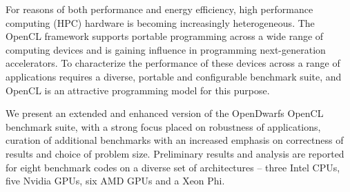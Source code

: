 \documentclass[../document.tex]{subfiles}
\begin{document}
For reasons of both performance and energy efficiency, high performance computing (HPC) hardware is becoming increasingly heterogeneous.
The OpenCL framework supports portable programming across a wide range of computing devices and is gaining influence in programming next-generation accelerators.
To characterize the performance of these devices across a range of applications requires a diverse, portable and configurable benchmark suite, and OpenCL is an attractive programming model for this purpose.


We present an extended and enhanced version of the OpenDwarfs OpenCL benchmark suite, with a strong focus placed on robustness of applications, curation of additional benchmarks with an increased emphasis on correctness of results and choice of problem size.
Preliminary results and analysis are reported for eight benchmark codes on a diverse set of architectures -- three Intel CPUs, five Nvidia GPUs, six AMD GPUs and a Xeon Phi.



\end{document}
